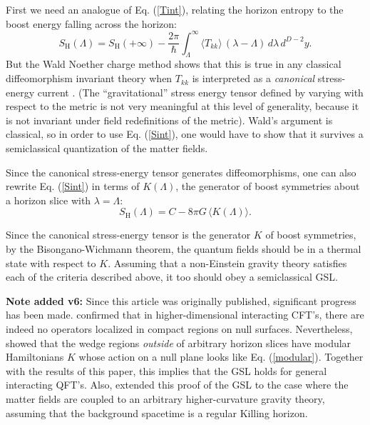 \documentclass{article}
\begin{document}
First we need an analogue of Eq. (\ref{Tint}), relating the horizon entropy to the boost energy falling across the horizon:
\begin{equation}\label{Sint}
S_\mathrm{H}(\Lambda) = S_\mathrm{H}(+\infty)
- \frac{2\pi}{\hbar} \int_\Lambda^\infty \langle T_{kk} \rangle \,(\lambda - \Lambda) \,d\lambda\,d^{D-2}y.
\end{equation}
But the Wald Noether charge method shows that this is true in any classical diffeomorphism invariant theory when $T_{kk}$ is interpreted as a \emph{canonical} stress-energy current \cite{WI94}.  (The ``gravitational'' stress energy tensor defined by varying with respect to the metric is not very meaningful at this level of generality, because it is not invariant under field redefinitions of the metric).  Wald's argument is classical, so in order to use Eq. (\ref{Sint}), one would have to show that it survives a semiclassical quantization of the matter fields.

Since the canonical stress-energy tensor generates diffeomorphisms, one can also rewrite Eq. (\ref{Sint}) in terms of $K(\Lambda)$, the generator of boost symmetries about a horizon slice with $\lambda = \Lambda$:
\begin{equation}
S_\mathrm{H}(\Lambda) = C - 8\pi G\,\langle K(\Lambda) \rangle.
\end{equation}

Since the canonical stress-energy tensor is the generator $K$ of boost symmetries, by the Bisongano-Wichmann theorem, the quantum fields should be in a thermal state with respect to $K$.  Assuming that a non-Einstein gravity theory satisfies each of the criteria described above, it too should obey a semiclassical GSL.

\textbf{Note added v6:} Since this article was originally published, significant progress has been made.  \cite{Bousso:2014uxa} confirmed that in higher-dimensional interacting CFT's, there are indeed no operators localized in compact regions on null surfaces.  Nevertheless, \cite{Casini:2017roe,Lashkari:2017rcl} showed that the wedge regions \emph{outside} of arbitrary horizon slices have modular Hamiltonians $K$ whose action on a null plane looks like Eq. (\ref{modular}).  Together with the results of this paper, this implies that the GSL holds for general interacting QFT's.  Also, \cite{Wall:2015raa} extended this proof of the GSL to the case where the matter fields are coupled to an arbitrary higher-curvature gravity theory, assuming that the background spacetime is a regular Killing horizon.
\end{document}
